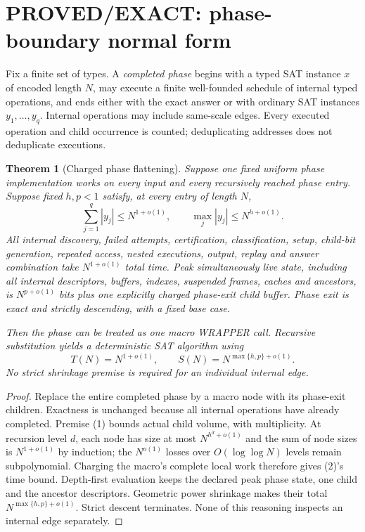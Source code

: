 \documentclass[11pt]{article}
\newtheorem{theorem}{Theorem}
\begin{document}
\section{PROVED/EXACT: phase-boundary normal form}
Fix a finite set of types.  A \emph{completed phase} begins with a typed SAT
instance $x$ of encoded length $N$, may execute a finite well-founded schedule
of internal typed operations, and ends either with the exact answer or with
ordinary SAT instances $y_1,\ldots,y_q$.  Internal operations may include
same-scale edges.  Every executed operation and child occurrence is counted;
deduplicating addresses does not deduplicate executions.

\begin{theorem}[Charged phase flattening]
Suppose one fixed uniform phase implementation works on every input and every
recursively reached phase entry.  Suppose fixed $h,p<1$ satisfy, at every
entry of length $N$,
\[
 \sum_{j=1}^{q}|y_j|\le N^{1+o(1)},\qquad
 \max_j|y_j|\le N^{h+o(1)}. \tag{1}
\]
All internal discovery, failed attempts, certification, classification,
setup, child-bit generation, repeated access, nested executions, output,
replay and answer combination take $N^{1+o(1)}$ total time.  Peak
simultaneously live state, including all internal descriptors, buffers,
indexes, suspended frames, caches and ancestors, is $N^{p+o(1)}$ bits plus
one explicitly charged phase-exit child buffer.  Phase exit is exact and
strictly descending, with a fixed base case.

Then the phase can be treated as one macro WRAPPER call.  Recursive
substitution yields a deterministic SAT algorithm using
\[
 T(N)=N^{1+o(1)},\qquad
 S(N)=N^{\max\{h,p\}+o(1)}. \tag{2}
\]
No strict shrinkage premise is required for an individual internal edge.
\end{theorem}
\begin{proof}
Replace the entire completed phase by a macro node with its phase-exit
children.  Exactness is unchanged because all internal operations have
already completed.  Premise (1) bounds actual child volume, with
multiplicity.  At recursion level $d$, each node has size at most
$N^{h^d+o(1)}$ and the sum of node sizes is $N^{1+o(1)}$ by induction;
the $N^{o(1)}$ losses over $O(\log\log N)$ levels remain subpolynomial.
Charging the macro's complete local work therefore gives (2)'s time bound.
Depth-first evaluation keeps the declared peak phase state, one child and
the ancestor descriptors.  Geometric power shrinkage makes their total
$N^{\max\{h,p\}+o(1)}$.  Strict descent terminates.  None of this reasoning
inspects an internal edge separately.
\end{proof}
\end{document}
